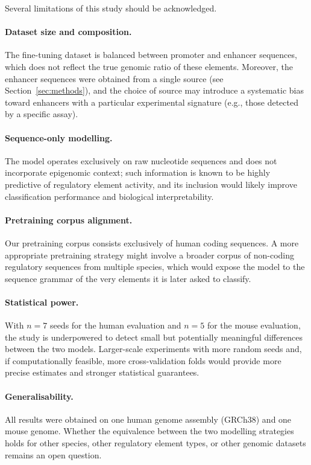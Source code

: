 \documentclass[11pt,a4paper,twoside]{article}
\begin{document}
Several limitations of this study should be acknowledged.

\paragraph{Dataset size and composition.}
The fine-tuning dataset is balanced between promoter and enhancer sequences, which does not reflect the true genomic ratio of these elements.
Moreover, the enhancer sequences were obtained from a single source (see Section~\ref{sec:methods}), and the choice of source may introduce a systematic bias toward enhancers with a particular experimental signature (e.g., those detected by a specific assay).

\paragraph{Sequence-only modelling.}
The model operates exclusively on raw nucleotide sequences and does not incorporate epigenomic context; such information is known to be highly predictive of regulatory element activity, and its inclusion would likely improve classification performance and biological interpretability.

\paragraph{Pretraining corpus alignment.}
Our pretraining corpus consists exclusively of human coding sequences.
A more appropriate pretraining strategy might involve a broader corpus of non-coding regulatory sequences from multiple species, which would expose the model to the sequence grammar of the very elements it is later asked to classify.

\paragraph{Statistical power.}
With $n = 7$ seeds for the human evaluation and $n = 5$ for the mouse evaluation, the study is underpowered to detect small but potentially meaningful differences between the two models.
Larger-scale experiments with more random seeds and, if computationally feasible, more cross-validation folds would provide more precise estimates and stronger statistical guarantees.

\paragraph{Generalisability.}
All results were obtained on one human genome assembly (GRCh38) and one mouse genome.
Whether the equivalence between the two modelling strategies holds for other species, other regulatory element types, or other genomic datasets remains an open question.
\end{document}
